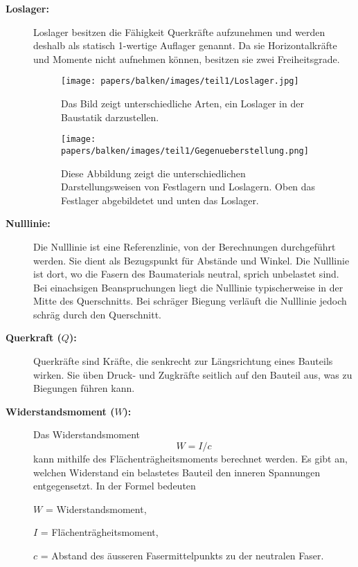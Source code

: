 \begin{description}
\item[\textbf{Loslager:}] Loslager besitzen die Fähigkeit Querkräfte aufzunehmen und werden deshalb als statisch 1-wertige Auflager genannt.
%
Da sie Horizontalkräfte und Momente nicht aufnehmen können, besitzen sie zwei Freiheitsgrade.
\begin{figure}
	\centering
	\texttt{[image: papers/balken/images/teil1/Loslager.jpg]}
	\caption{Das Bild zeigt unterschiedliche Arten, ein Loslager in der Baustatik darzustellen.}
	\label{fig:Das Bild zeigt unterschiedliche Arten, ein Loslager in der Baustatik darzustellen.}
\end{figure}
\begin{figure}
\centering
\texttt{[image: papers/balken/images/teil1/Gegenueberstellung.png]}
\caption{Diese Abbildung zeigt die unterschiedlichen Darstellungsweisen von Festlagern und Loslagern. Oben das Festlager abgebildetet und unten das Loslager.}
\label{fig:Diese Abbildung zeigt die unterschiedlichen Darstellungsweisen von Festlagern und Loslagern. Oben das Festlager abgebildetet und unten das Loslager.}
\end{figure}

\item[\textbf{Nulllinie:}] Die Nulllinie ist eine Referenzlinie, von der Berechnungen durchgeführt werden. Sie dient als Bezugspunkt für Abstände und Winkel.
%
Die Nulllinie ist dort, wo die Fasern des Baumaterials neutral, sprich unbelastet sind.
Bei einachsigen Beanspruchungen liegt die Nulllinie typischerweise in der Mitte des Querschnitts.
Bei schräger Biegung verläuft die Nulllinie jedoch schräg durch den Querschnitt.

\item[\textbf{Querkraft ($Q$):}] Querkräfte sind Kräfte, die senkrecht zur Längsrichtung eines Bauteils wirken.
%
Sie üben Druck- und Zugkräfte seitlich auf den Bauteil aus, was zu Biegungen führen kann.

\item[\textbf{Widerstandsmoment ($W$):}] Das Widerstandsmoment
%
\begin{equation*}
W=I/c
\end{equation*}
kann mithilfe des Flächenträgheitsmoments berechnet werden.
Es gibt an, welchen Widerstand ein belastetes Bauteil den inneren Spannungen entgegensetzt. In der Formel bedeuten

$W$ = Widerstandsmoment,

$I$ = Flächenträgheitsmoment,

$c$ = Abstand des äusseren Fasermittelpunkts zu der neutralen Faser.
\end{description}

